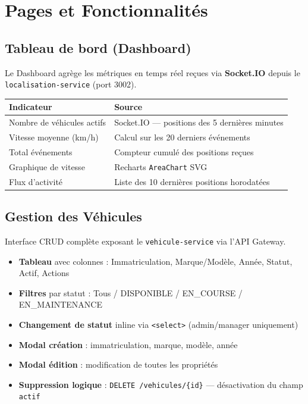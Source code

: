 \documentclass[12pt,a4paper]{report}
\begin{document}
\chapter{Pages et Fonctionnalités}

\section{Tableau de bord (Dashboard)}

Le Dashboard agrège les métriques en temps réel reçues via \textbf{Socket.IO}
depuis le \texttt{localisation-service} (port 3002).

\begin{center}
\begin{tabular}{|l|l|}
  \hline
  \rowcolor{lightblue}
  \textbf{Indicateur} & \textbf{Source} \\
  \hline
  Nombre de véhicules actifs   & Socket.IO — positions des 5 dernières minutes \\
  Vitesse moyenne (km/h)       & Calcul sur les 20 derniers événements \\
  Total événements             & Compteur cumulé des positions reçues \\
  Graphique de vitesse         & Recharts \texttt{AreaChart} SVG \\
  Flux d'activité              & Liste des 10 dernières positions horodatées \\
  \hline
\end{tabular}
\end{center}

\section{Gestion des Véhicules}

Interface CRUD complète exposant le \texttt{vehicule-service} via l'API Gateway.

\begin{itemize}
  \item \textbf{Tableau} avec colonnes : Immatriculation, Marque/Modèle, Année, Statut, Actif, Actions
  \item \textbf{Filtres} par statut : Tous / DISPONIBLE / EN\_COURSE / EN\_MAINTENANCE
  \item \textbf{Changement de statut} inline via \texttt{<select>} (admin/manager uniquement)
  \item \textbf{Modal création} : immatriculation, marque, modèle, année
  \item \textbf{Modal édition} : modification de toutes les propriétés
  \item \textbf{Suppression logique} : \texttt{DELETE /vehicules/\{id\}} — désactivation du champ \texttt{actif}
\end{itemize}
\end{document}

